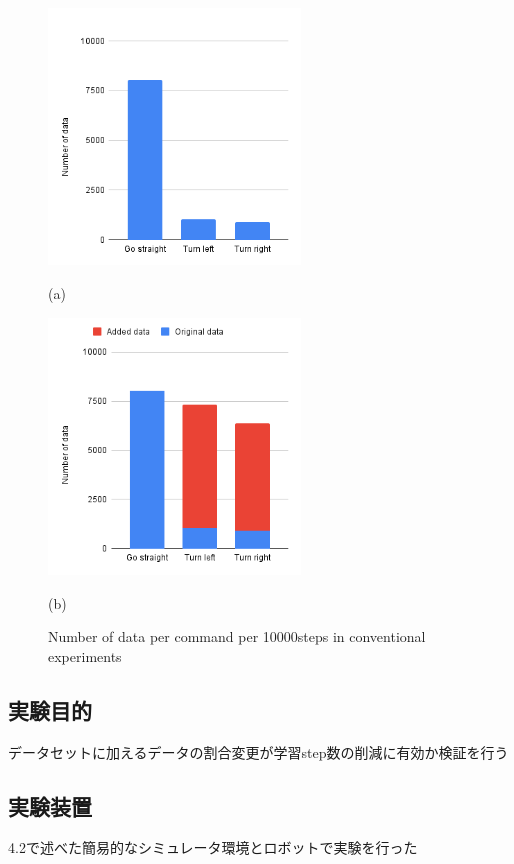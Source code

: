 \begin{figure}[h]
  \centering
  \begin{minipage}[b]{67mm}
    \centering
    \includegraphics[width=67mm]{images/hist_change_org.png}
    \caption*{(a)}
  \end{minipage} 
  \begin{minipage}[b]{67mm}
    \centering
    \includegraphics[width=67mm]{images/hist_change_times7.png}
    \caption*{(b)}
  \end{minipage}
  \caption{Number of data per command per 10000steps in conventional experiments}
  \label{Fig:hist}
\end{figure}

\subsection{実験目的}
データセットに加えるデータの割合変更が学習step数の削減に有効か検証を行う
\subsection{実験装置}
4.2で述べた簡易的なシミュレータ環境とロボットで実験を行った
